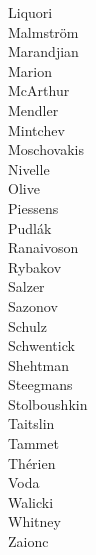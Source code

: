 \begin{minipage}[t]{5cm}
Liquori	 \\[.1cm]
Malmstr\"om	 \\[.1cm]
Marandjian	 \\[.1cm]
Marion	 \\[.1cm]
McArthur	 \\[.1cm]
Mendler	 \\[.1cm]
Mintchev	 \\[.1cm]
Moschovakis	 \\[.1cm]
Nivelle	 \\[.1cm]
Olive	 \\[.1cm]
Piessens	 \\[.1cm]
Pudl\'ak	 \\[.1cm]
Ranaivoson	 \\[.1cm]
Rybakov	 \\[.1cm]
Salzer	 \\[.1cm]
Sazonov	 \\[.1cm]
Schulz	 \\[.1cm]
Schwentick	 \\[.1cm]
Shehtman	 \\[.1cm]
Steegmans	 \\[.1cm]
Stolboushkin	 \\[.1cm]
Taitslin	 \\[.1cm]
Tammet	 \\[.1cm]
Th\'erien	 \\[.1cm]
Voda	 \\[.1cm]
Walicki	 \\[.1cm]
Whitney	 \\[.1cm]
Zaionc	 \\[.1cm]
\end{minipage}
\eject
~



